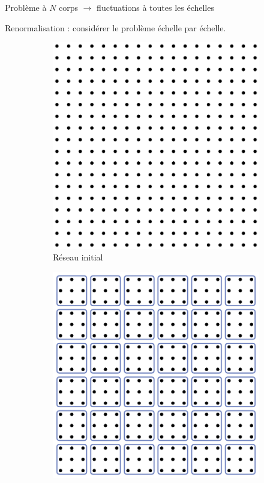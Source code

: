 \documentclass[xcolor=dvipsnames]{beamer}
\begin{document}
\begin{frame}

\centering 
Problème à $N$ corps $\rightarrow$ fluctuations à toutes les échelles

Renormalisation : considérer le problème échelle par échelle.

\begin{figure}[htp]
\centering
\begin{subfigure}{.25\textwidth}
	\centering
	\includegraphics[width=.9\linewidth]{img/renorm_step0.pdf}
	\caption{Réseau initial}
	\end{subfigure}%
\begin{subfigure}{.25\textwidth}
	\centering
	\includegraphics[width=.9\linewidth]{img/renorm_step1.pdf}

\end{subfigure}
\end{figure}
\end{frame}
\end{document}
